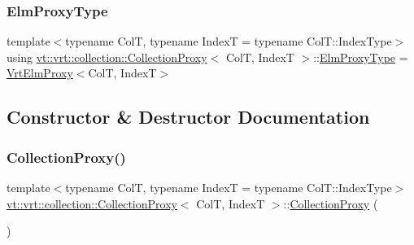 \subsubsection{\texorpdfstring{Elm\+Proxy\+Type}{ElmProxyType}}
{\footnotesize\ttfamily template$<$typename ColT, typename IndexT = typename Col\+T\+::\+Index\+Type$>$ \\
using \hyperlink{structvt_1_1vrt_1_1collection_1_1_collection_proxy}{vt\+::vrt\+::collection\+::\+Collection\+Proxy}$<$ ColT, IndexT $>$\+::\hyperlink{structvt_1_1vrt_1_1collection_1_1_collection_proxy_a892c21eae1dca37321d7973f72b55b0a}{Elm\+Proxy\+Type} =  \hyperlink{structvt_1_1vrt_1_1collection_1_1_vrt_elm_proxy}{Vrt\+Elm\+Proxy}$<$ColT, IndexT$>$}



\subsection{Constructor \& Destructor Documentation}
\mbox{\label{structvt_1_1vrt_1_1collection_1_1_collection_proxy_a5cc052678774abc3b4811f273f0df405}} 
\subsubsection{\texorpdfstring{Collection\+Proxy()}{CollectionProxy()}\hspace{0.1cm}{\footnotesize\ttfamily [1/3]}}
{\footnotesize\ttfamily template$<$typename ColT, typename IndexT = typename Col\+T\+::\+Index\+Type$>$ \\
\hyperlink{structvt_1_1vrt_1_1collection_1_1_collection_proxy}{vt\+::vrt\+::collection\+::\+Collection\+Proxy}$<$ ColT, IndexT $>$\+::\hyperlink{structvt_1_1vrt_1_1collection_1_1_collection_proxy}{Collection\+Proxy} (\begin{DoxyParamCaption}{ }\end{DoxyParamCaption})\hspace{0.3cm}{\ttfamily [default]}}

\mbox{\label{structvt_1_1vrt_1_1collection_1_1_collection_proxy_ae9e5efa3735abd08a7b3d68375447f92}} 

